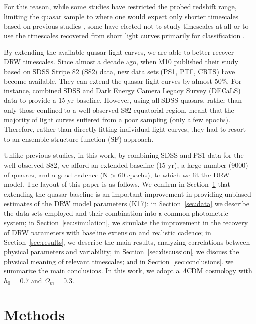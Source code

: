 \documentclass[twocolumn]{aastex62}
\begin{document}
For this reason, while some studies have restricted the probed redshift range, limiting the quasar sample to where one would expect only shorter timescales based on previous studies \citep{kelly2013, simm2016,guo2017,sun2018}, some have elected not to study timescales at all \citep{sun2018,sanchez2018} or to use the timescales recovered from short light curves primarily for classification \citep{hernitschek2016}.

By extending the available quasar light curves, we are able to better recover DRW timescales. Since almost a decade ago, when M10 published their study based on SDSS Stripe 82 (S82) data, new data sets (PS1, PTF, CRTS) have become available. They can extend the quasar light curves by almost 50\%.  For instance, \citet{li2018} combined SDSS and Dark Energy Camera Legacy Survey  (DECaLS) data to provide a 15 yr baseline. However, using all SDSS quasars, rather than only those confined to a well-observed S82  equatorial region, meant  that the majority of light curves suffered from a poor sampling (only a few epochs). Therefore, rather than directly fitting individual light curves, they had to resort to an ensemble structure function (SF) approach.

 Unlike previous studies, in this work, by combining SDSS and PS1 data for the well-observed S82, we afford an extended baseline (15 yr), a large number (9000) of quasars, and  a good cadence (N > 60 epochs), to which we fit the DRW model. The layout of this paper is as follows. We confirm in Section~\ref{sec:methods} that extending the quasar baseline is an important improvement in providing unbiased estimates of the DRW model parameters (K17);  in Section~\ref{sec:data} we describe the data sets employed and their combination into a common photometric system;  in Section~\ref{sec:simulation}, we simulate the improvement in the recovery of DRW parameters with baseline extension and realistic cadence; in Section~\ref{sec:results}, we describe the main results, analyzing correlations between physical parameters and variability; in Section~\ref{sec:discussion}, we discuss the physical meaning of relevant timescales; and in Section~\ref{sec:conclusions}, we summarize the main conclusions. In this work, we adopt a $\Lambda $CDM cosmology with $h_{0} = 0.7$ and $\Omega_{m} = 0.3 $. 
\newline
%
%
%
%
\section{Methods}
\label{sec:methods}
\end{document}
